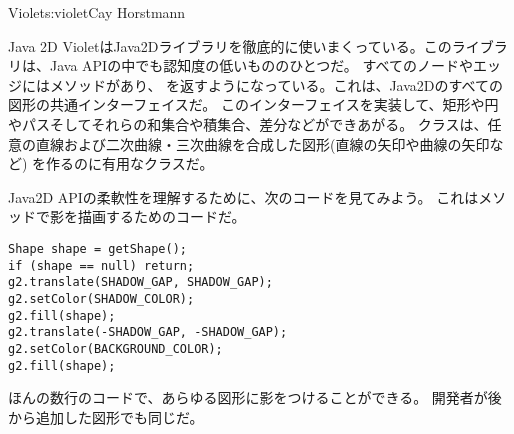 \begin{aosachapter}{Violet}{s:violet}{Cay Horstmann}
\begin{aosasect1}{Java 2D}
VioletはJava2Dライブラリを徹底的に使いまくっている。このライブラリは、Java APIの中でも認知度の低いもののひとつだ。
すべてのノードやエッジにはメソッドがあり、
を返すようになっている。これは、Java2Dのすべての図形の共通インターフェイスだ。
このインターフェイスを実装して、矩形や円やパスそしてそれらの和集合や積集合、差分などができあがる。
クラスは、任意の直線および二次曲線・三次曲線を合成した図形(直線の矢印や曲線の矢印など)
を作るのに有用なクラスだ。

Java2D APIの柔軟性を理解するために、次のコードを見てみよう。
これはメソッドで影を描画するためのコードだ。

\begin{verbatim}
Shape shape = getShape();
if (shape == null) return;
g2.translate(SHADOW_GAP, SHADOW_GAP);
g2.setColor(SHADOW_COLOR);
g2.fill(shape);
g2.translate(-SHADOW_GAP, -SHADOW_GAP);
g2.setColor(BACKGROUND_COLOR);
g2.fill(shape);
\end{verbatim}

\noindent
ほんの数行のコードで、あらゆる図形に影をつけることができる。
開発者が後から追加した図形でも同じだ。


\end{aosasect1}
\end{aosachapter}

